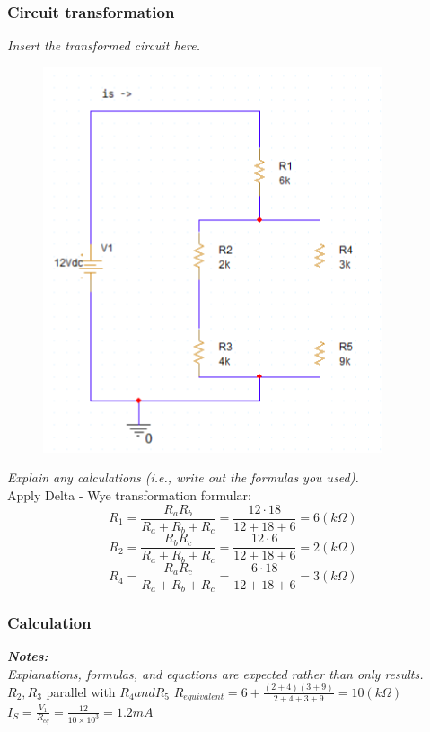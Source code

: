 \subsubsection{Circuit transformation}
\textit{Insert the transformed circuit here.}
\begin{figure}[H]
    \centering
    \includegraphics[width = 10cm]{source/picture/bai_1/ex7_rearrange.png}
\end{figure}
\newpage
\textit{Explain any calculations (i.e., write out the formulas you used).}\\
\bigskip
Apply Delta - Wye transformation formular:
$$ R_1 = \frac{R_aR_b}{R_a + R_b + R_c} = \frac{12\cdot 18}{12 + 18 + 6} = 6 (k\Omega)$$
$$ R_2 = \frac{R_bR_c}{R_a + R_b + R_c} = \frac{12\cdot 6}{12 + 18 + 6} = 2 (k\Omega)$$
$$ R_4 = \frac{R_aR_c}{R_a + R_b + R_c} = \frac{6\cdot 18}{12 + 18 + 6} = 3(k\Omega)$$
\bigskip



\subsubsection{Calculation}
\textit{\textbf{Notes:}}\\
\textit{Explanations, formulas, and equations are expected rather than only results.}\bigskip\\

$R_2, R_3$ parallel with $R_4 and R_5$
$R_{equivalent} = 6 + \frac{(2+4)(3+9)}{2+4+3+9} = 10 (k\Omega)$\dotfill\bigskip\\
$I_S = \frac{V_1}{R_{eq}} = \frac{12}{10\times10^{3}} = 1.2 mA$\dotfill\bigskip

